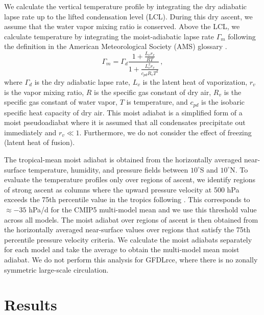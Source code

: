 \documentclass{ametsocV5}
\begin{document}
We calculate the vertical temperature profile by integrating the dry adiabatic lapse rate up to the lifted condensation level (LCL). During this dry ascent, we assume that the water vapor mixing ratio is conserved. Above the LCL, we calculate temperature by integrating the moist-adiabatic lapse rate $\Gamma_m$ following the definition in the American Meteorological Society (AMS) glossary \citep{ams-standard}. 
\begin{equation}
\Gamma_m = \Gamma_d \frac{1 + \frac{L_v r_v}{RT}}{1 + \frac{L_v^2 r_v}{c_{pd} R_v T^2}} \, ,
\end{equation}
where $\Gamma_d$ is the dry adiabatic lapse rate, $L_v$ is the latent heat of vaporization, $r_v$ is the vapor mixing ratio, $R$ is the specific gas constant of dry air, $R_v$ is the specific gas constant of water vapor, $T$ is temperature, and $c_{pd}$ is the isobaric specific heat capacity of dry air. This moist adiabat is a simplified form of a moist pseudoadiabat where it is assumed that all condensates precipitate out immediately and $r_v \ll 1$. Furthermore, we do not consider the effect of freezing (latent heat of fusion).

The tropical-mean moist adiabat is obtained from the horizontally averaged near-surface temperature, humidity, and pressure fields between $10^\circ$S and $10^\circ$N. To evaluate the temperature profiles only over regions of ascent, we identify regions of strong ascent as columns where the upward pressure velocity at 500 hPa exceeds the 75th percentile value in the tropics following \citet{sherwood-et-al-2014}. This corresponds to $\approx-35$ hPa/d for the CMIP5 multi-model mean and we use this threshold value across all models. The moist adiabat over regions of ascent is then obtained from the horizontally averaged near-surface values over regions that satisfy the 75th percentile pressure velocity criteria. We calculate the moist adiabats separately for each model and take the average to obtain the multi-model mean moist adiabat. We do not perform this analysis for GFDLrce, where there is no zonally symmetric large-scale circulation.

\section{Results}
\end{document}
